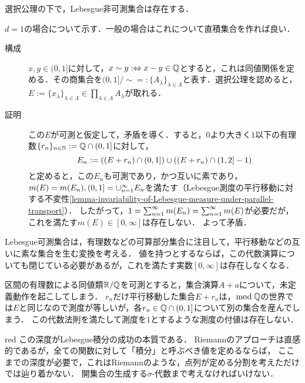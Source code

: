 \documentclass[uplatex, dvipdfmx]{jsreport}
\begin{document}
\begin{theorem}[Lebesgue非可測集合]\label{thm-existence-of-unmeasurable-sets}
    選択公理の下で，Lebesgue非可測集合は存在する．
\end{theorem}
\begin{Proof}
    $d=1$の場合について示す．一般の場合はこれについて直積集合を作れば良い．
    \begin{description}
        \item[構成] 
        $x,y\in(0,1]$に対して，$x\sim y:\Leftrightarrow x-y\in\mathbb{Q}$とすると，これは同値関係を定める．その商集合を$(0,1]/\sim=:\{A_\lambda\}_{\lambda\in\Lambda}$と表す．選択公理を認めると，$E:=\{x_\lambda\}_{\lambda\in\Lambda}\in\prod_{\lambda\in\Lambda}A_\lambda$が取れる．
        \item[証明]
        この$E$が可測と仮定して，矛盾を導く．すると，$0$より大きく$1$以下の有理数$\{r_n\}_{n\in\mathbb{N}}:=\mathbb{Q}\cap(0,1]$に対して，
        \[E_n:=\left((E+r_n)\cap(0,1]\right)\cup\left((E+r_n)\cap(1,2]-1\right)\]
        と定めると，この$E_n$も可測であり，かつ互いに素であり，$m(E)=m(E_n),(0,1]=\cup_{n=1}^\infty E_n$を満たす（Lebesgue測度の平行移動に対する不変性\ref{lemma-invariability-of-Lebesgue-measure-under-parallel-transport}）．
        したがって，$1=\sum_{n=1}^\infty m(E_n)=\sum_{n=1}^\infty m(E)$が必要だが，これを満たす$m(E)\in[0,\infty]$は存在しない．
        よって矛盾．
    \end{description}
\end{Proof}
\begin{remarks}
    Lebesgue可測集合は，有理数などの可算部分集合に注目して，平行移動などの互いに素な集合を生む変換を考える．
        値を持つとするならば，この代数演算についても閉じている必要があるが，これを満たす実数$[0,\infty]$は存在しなくなる．

    区間の有理数による同値類$\mathbb{R}/\mathbb{Q}$を可測とすると，集合演算$A+a$について，未定義動作を起こしてしまう．
    $r_n$だけ平行移動した集合$E+r_n$は，$\mathrm{mod}\;\mathbb{Q}$の世界では$E$と同じなので測度が等しいが，各$r_n\in\mathbb{Q}\cap(0,1]$について別の集合を産んでしまう．
    この代数法則を満たして測度を$1$とするような測度の付値は存在しない．
\end{remarks}

\begin{tbox}{red}{}
    この深度がLebesgue積分の成功の本質である．
    Riemannのアプローチは直感的であるが，全ての関数に対して「積分」と呼ぶべき値を定めるならば，
    ここまでの深度が必要で，これはRiemannのような，点列が定める分割を考えただけでは辿り着かない．
    開集合の生成する$\sigma$-代数まで考えなければいけない．
\end{tbox}
\end{document}
